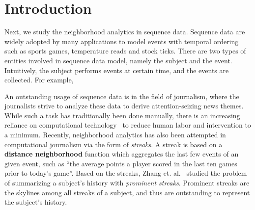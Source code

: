 \section{Introduction}
Next, we study the neighborhood analytics in sequence data.
Sequence data are widely adopted by many applications 
to model events with temporal ordering such as
sports games, temperature reads and stock ticks.
There are two types of entities involved in sequence data model, namely the subject
and the event. Intuitively, the subject performs events at certain time, and the events
are collected. For example, 

An outstanding usage of sequence data is in the field of journalism,
where the journalists strive to
analyze these data to derive attention-seizing news themes. 
While such a task has traditionally been done manually,
there is an increasing reliance on computational technology~\cite{sultana2014incremental,wu2012one,hassan2014data} 
to reduce human labor and intervention to a minimum. Recently,
neighborhood analytics has also been attempted in computational journalism
via the form of \emph{streaks}. A streak is  based on
a \textbf{distance neighborhood} function which aggregates the last few events
of an given event, such as ``the average points a player scored in the last ten games prior to today's game''. 
Based on the streaks, Zhang et. al.~\cite{zhang2014discovering} studied the problem
of summarizing a subject's history with \emph{prominent streaks}. Prominent streaks
are the skylines among all streaks of a subject, and thus are outstanding to represent the subject's history.


%


